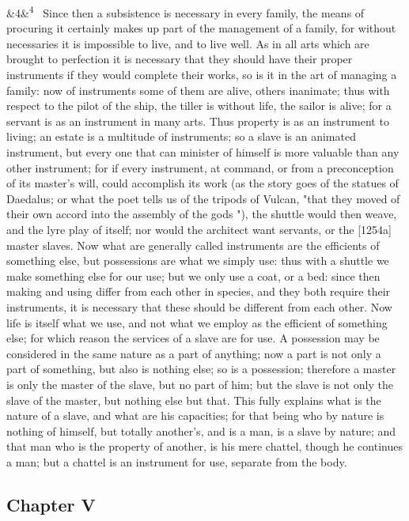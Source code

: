 \documentclass[12pt]{article}
\newcommand{\para}[1][]{\par\noindent\ifx&#1&\else\textsuperscript{\footnotesize #1}~\fi}
\begin{document}
\para[4] Since then a subsistence is necessary in every family, the means of procuring it certainly makes up part of the management of a family, for without necessaries it is impossible to live, and to live well. As in all arts which are brought to perfection it is necessary that they should have their proper instruments if they would complete their works, so is it in the art of managing a family: now of instruments some of them are alive, others inanimate; thus with respect to the pilot of the ship, the tiller is without life, the sailor is alive; for a servant is as an instrument in many arts. Thus property is as an instrument to living; an estate is a multitude of instruments; so a slave is an animated instrument, but every one that can minister of himself is more valuable than any other instrument; for if every instrument, at command, or from a preconception of its master's will, could accomplish its work (as the story goes of the statues of Daedalus; or what the poet tells us of the tripods of Vulcan, "that they moved of their own accord into the assembly of the gods "), the shuttle would then weave, and the lyre play of itself; nor would the architect want servants, or the [1254a] master slaves. Now what are generally called instruments are the efficients of something else, but possessions are what we simply use: thus with a shuttle we make something else for our use; but we only use a coat, or a bed: since then making and using differ from each other in species, and they both require their instruments, it is necessary that these should be different from each other. Now life is itself what we use, and not what we employ as the efficient of something else; for which reason the services of a slave are for use. A possession may be considered in the same nature as a part of anything; now a part is not only a part of something, but also is nothing else; so is a possession; therefore a master is only the master of the slave, but no part of him; but the slave is not only the slave of the master, but nothing else but that. This fully explains what is the nature of a slave, and what are his capacities; for that being who by nature is nothing of himself, but totally another's, and is a man, is a slave by nature; and that man who is the property of another, is his mere chattel, though he continues a man; but a chattel is an instrument for use, separate from the body.

\subsection*{Chapter V}
\end{document}
